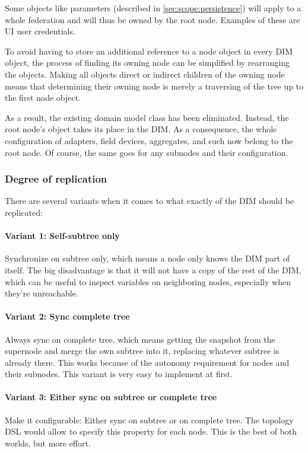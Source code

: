 Some objects like parameters (described in \autoref{sec:scope:persistence})
will apply to a whole federation and will thus be owned by the root node.
Examples of these are UI user credentials.

To avoid having to store an additional reference to a node object in every DIM
object, the process of finding its owning node can be simplified by rearranging
the objects. Making all objects direct or indirect children of the owning node
means that determining their owning node is merely a traversing of the tree up
to the first node object.

As a result, the existing domain model class 
has been eliminated. Instead, the root node's
 object takes its place in the DIM. As a
consequence, the whole configuration of adapters, field devices, aggregates,
and such now belong to the root node. Of course, the same goes for any subnodes
and their configuration.

\subsubsection{Degree of replication}
There are several variants when it comes to what exactly of the DIM should be replicated:

\paragraph{Variant 1: Self-subtree only}
Synchronize on subtree only, which means a node only knows the DIM part of
itself. The big disadvantage is that it will not have a copy of the rest of the
DIM, which can be useful to inspect variables on neighboring nodes, especially
when they're unreachable.

\paragraph{Variant 2: Sync complete tree}\label{par:approach:dim:var2}
Always sync on complete tree, which means getting the snapshot from the
supernode and merge the own subtree into it, replacing whatever subtree is
already there. This works because of the autonomy requirement for nodes and
their subnodes. This variant is very easy to implement at first.

\paragraph{Variant 3: Either sync on subtree or complete tree}
Make it configurable: Either sync on subtree or on complete tree. The
topology DSL would allow to specify this property for each node. This is
the best of both worlds, but more effort.

